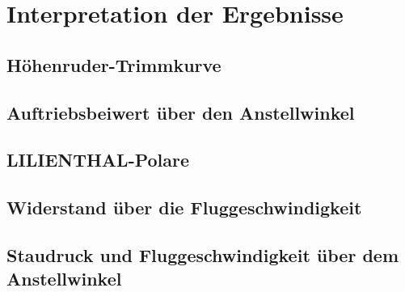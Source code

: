 \chapter{Interpretation der Ergebnisse}

\section{Höhenruder-Trimmkurve}
\newpage

\section{Auftriebsbeiwert über den Anstellwinkel}
\newpage

\section{LILIENTHAL-Polare}
\newpage

\section{Widerstand über die Fluggeschwindigkeit}
\newpage

\section{Staudruck und Fluggeschwindigkeit über dem Anstellwinkel}
\newpage